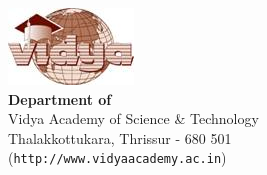 %
\newpage
\thispagestyle{empty}
\vspace*{\fill}
\begin{flushright}
\includegraphics{VidyaLogo}\\[0.5cm]
{\Large \bf \sf  Department of \vdept\ }\\
{\sf Vidya Academy of Science \& Technology\\
Thalakkottukara, Thrissur - 680 501\\
({\tt http://www.vidyaacademy.ac.in})}
\end{flushright}
%